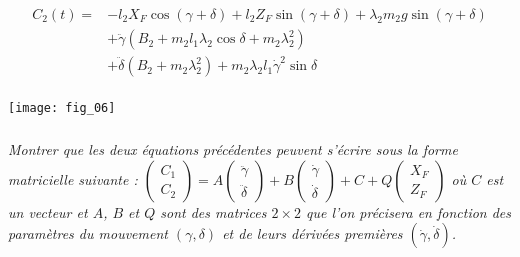 $$
\begin{array}{ll}
C_2(t) =&  - l_2X_F \cos \left(\gamma+\delta\right) 
             + l_2 Z_F \sin \left(\gamma+\delta\right) 
             + \lambda_2m_2g\sin \left(\gamma+\delta\right) \\
&  + \ddot{\gamma}\left(B_2+m_2l_1\lambda_2 \cos\delta + m_2\lambda_2^2\right) \\
& +\ddot{\delta}\left(B_2+ m_2 \lambda_2^2\right) +m_2\lambda_2 l_1 \dot{\gamma}^2 \sin \delta \\
\end{array}
$$


\begin{center}
\texttt{[image: fig\_06]}
\end{center}


\subparagraph{}\textit{Montrer que les deux équations précédentes peuvent s'écrire sous la forme matricielle suivante : 
$\begin{pmatrix}
C_1 \\ C_2
\end{pmatrix}
=
A
\begin{pmatrix}
\ddot{\gamma} \\ \ddot{\delta}
\end{pmatrix}
+
B
\begin{pmatrix}
\dot{\gamma} \\ \dot{\delta}
\end{pmatrix}
+
C
+
Q
\begin{pmatrix}
X_F \\ Z_F
\end{pmatrix}$ où $C$ est un vecteur et $A$, $B$ et $Q$ sont des matrices $2\times 2$ que l'on précisera en fonction des paramètres du mouvement $\left(\gamma,\delta\right)$ et de leurs dérivées premières $\left(\dot{\gamma},\dot{\delta}\right)$.
}

\ifprof
\begin{corrige}
\end{corrige}
\else
\fi


\ifprof
\begin{corrige}
\end{corrige}
\else
\fi


\ifprof
\begin{corrige}
\end{corrige}
\else
\fi



